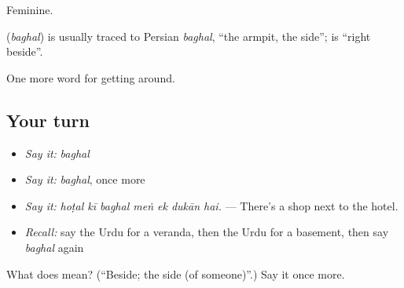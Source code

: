 Feminine.

\begin{cousinweb}
\textbf{} (\emph{baghal}) is usually traced to Persian \emph{baghal}, \textquotedblleft{}the armpit, the side\textquotedblright{}; \textbf{  } is \textquotedblleft{}right beside\textquotedblright{}.
\end{cousinweb}

\begin{grammarlens}[title={What you've built}]
One more word for getting around.
\end{grammarlens}

\subsection*{Your turn}
\begin{itemize}
\raggedright
  \item \emph{Say it:} \emph{baghal}
  \item \emph{Say it:} \emph{baghal}, once more
  \item \emph{Say it:} \emph{hoṭal kī baghal meṅ ek dukān hai.} — There's a shop next to the hotel.
  \item \emph{Recall:} say the Urdu for a veranda, then the Urdu for a basement, then say \emph{baghal} again
\end{itemize}

\begin{tcolorbox}[breakable,colback=teal!4,colframe=teal!35!black,title={Before you move on}]
What does  mean? (\textquotedblleft{}Beside; the side (of someone)\textquotedblright{}.) Say it once more.
\end{tcolorbox}
